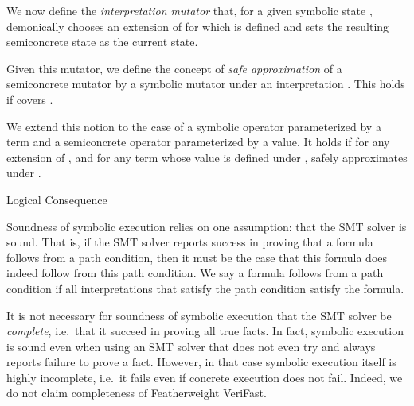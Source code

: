 \documentclass{CSML}
\theoremstyle{definition}\newtheorem{notation}[thm]{Notation}
\theoremstyle{plain}\newtheorem{satz}[thm]{Satz}
\begin{document}
We now define the \emph{interpretation mutator}  that, for a given 
symbolic state , demonically chooses an extension  of 
 for which  is defined and sets the resulting 
semiconcrete state as the current state. 

Given this mutator, we define the concept of \emph{safe approximation}  of a semiconcrete mutator  by a symbolic 
mutator  under an interpretation . This holds if  
covers . 

We extend this notion to the case of a symbolic operator  
parameterized by a term and a semiconcrete operator  
parameterized by a value. It holds if for any extension  of , and 
for any term whose value is defined under ,  safely approximates 
 under . 

\begin{defi}{Logical Consequence}

\end{defi}

\begin{asm}

\end{asm}\medskip

\noindent Soundness of symbolic execution relies on one assumption: that the SMT 
solver is sound. That is, if the SMT solver reports success in proving 
that a formula follows from a path condition, then it must be the case 
that this formula does indeed follow from this path condition. We say a 
formula follows from a path condition if all interpretations that satisfy 
the path condition satisfy the formula.

It is not necessary for soundness of symbolic execution that the SMT 
solver be \emph{complete}, i.e.~that it succeed in proving all true 
facts. In fact, symbolic execution is sound even when using an SMT solver 
that does not even try and always reports failure to prove a fact. 
However, in that case symbolic execution itself is highly incomplete, 
i.e.~it fails even if concrete execution does not fail. Indeed, we do not 
claim completeness of Featherweight VeriFast. 
\end{document}
